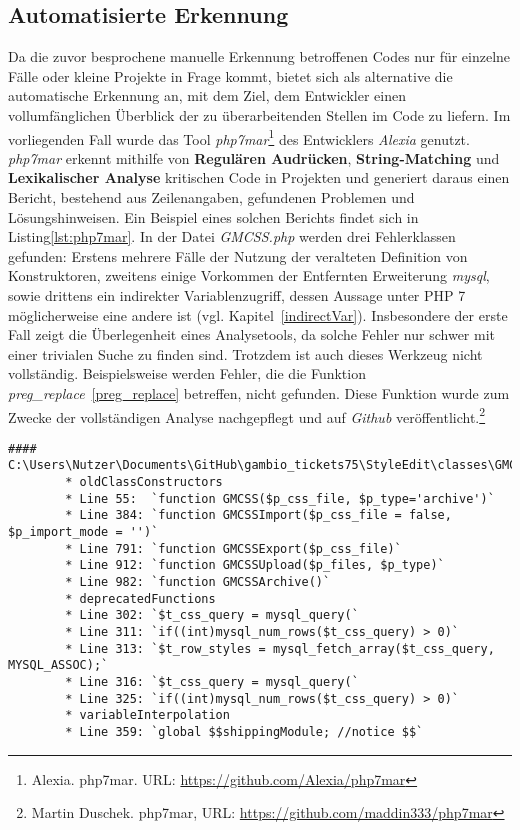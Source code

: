     \subsection{Automatisierte Erkennung}\label{automatic}
        Da die zuvor besprochene manuelle Erkennung betroffenen Codes nur für einzelne Fälle oder kleine Projekte in Frage kommt, bietet sich als alternative die 
        automatische Erkennung an, mit dem Ziel, dem Entwickler einen vollumfänglichen Überblick der zu überarbeitenden Stellen im Code zu liefern. Im vorliegenden Fall
        wurde das Tool \textit{\ac{php7mar}}\footnote{Alexia. php7mar. URL: \url{https://github.com/Alexia/php7mar}} des Entwicklers \textit{Alexia} genutzt.
        \textit{\ac{php7mar}} erkennt mithilfe von \textbf{Regulären Audrücken}, \textbf{String-Matching} und \textbf{Lexikalischer Analyse} kritischen Code in 
        Projekten und generiert daraus einen Bericht, bestehend aus Zeilenangaben, gefundenen Problemen und Lösungshinweisen. Ein Beispiel eines solchen Berichts findet
        sich in Listing\ref{lst:php7mar}. In der Datei \textit{GMCSS.php} werden drei Fehlerklassen gefunden: Erstens mehrere Fälle der Nutzung der veralteten Definition von
        Konstruktoren, zweitens einige Vorkommen der Entfernten Erweiterung \textit{mysql}, sowie drittens ein indirekter Variablenzugriff, dessen Aussage unter PHP 7
        möglicherweise eine andere ist (vgl. Kapitel~\ref{indirectVar}). Insbesondere der erste Fall zeigt die Überlegenheit eines Analysetools, da solche Fehler nur
        schwer mit einer trivialen Suche zu finden sind. Trotzdem ist auch dieses Werkzeug nicht vollständig. Beispielsweise werden Fehler, die die Funktion 
        \textit{preg\_replace}~\ref{preg_replace} betreffen, nicht gefunden. Diese Funktion wurde zum Zwecke der vollständigen Analyse nachgepflegt und auf 
        \textit{Github} veröffentlicht.\footnote{Martin Duschek. php7mar, URL: \url{https://github.com/maddin333/php7mar}}

        \begin{lstlisting}[caption={Beispiel eines generierten Berichts mit \textit{\ac{php7mar}}}, label={lst:php7mar}]
        #### C:\Users\Nutzer\Documents\GitHub\gambio_tickets75\StyleEdit\classes\GMCSS.php
        * oldClassConstructors
        * Line 55:  `function GMCSS($p_css_file, $p_type='archive')`
        * Line 384: `function GMCSSImport($p_css_file = false, $p_import_mode = '')`
        * Line 791: `function GMCSSExport($p_css_file)`
        * Line 912: `function GMCSSUpload($p_files, $p_type)`
        * Line 982: `function GMCSSArchive()`
        * deprecatedFunctions
        * Line 302: `$t_css_query = mysql_query(`
        * Line 311: `if((int)mysql_num_rows($t_css_query) > 0)`
        * Line 313: `$t_row_styles = mysql_fetch_array($t_css_query, MYSQL_ASSOC);`
        * Line 316: `$t_css_query = mysql_query(`
        * Line 325: `if((int)mysql_num_rows($t_css_query) > 0)`
        * variableInterpolation
        * Line 359: `global $$shippingModule; //notice $$`
        \end{lstlisting}

